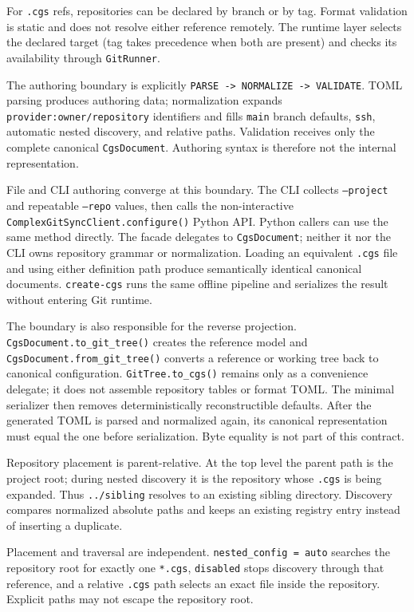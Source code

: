 For \texttt{.cgs} refs, repositories can be declared by branch or by tag.
Format validation is static and does not resolve either reference remotely.
The runtime layer selects the declared target (tag takes precedence when both
are present) and checks its availability through \texttt{GitRunner}.

The authoring boundary is explicitly
\texttt{PARSE -> NORMALIZE -> VALIDATE}.  TOML parsing produces authoring data;
normalization expands \texttt{provider:owner/repository} identifiers and fills
\texttt{main} branch defaults, \texttt{ssh}, automatic nested discovery, and
relative paths.  Validation receives only the complete canonical
\texttt{CgsDocument}.  Authoring syntax is therefore not the internal
representation.

File and CLI authoring converge at this boundary. The CLI collects
\texttt{--project} and repeatable \texttt{--repo} values, then calls the
non-interactive \texttt{ComplexGitSyncClient.configure()} Python API. Python
callers can use the same method directly. The facade delegates to
\texttt{CgsDocument}; neither it nor the CLI owns repository grammar or
normalization. Loading an equivalent \texttt{.cgs} file and using either
definition path produce semantically identical canonical documents.
\texttt{create-cgs} runs the same offline pipeline and serializes the result
without entering Git runtime.

The boundary is also responsible for the reverse projection.
\texttt{CgsDocument.to\_git\_tree()} creates the reference model and
\texttt{CgsDocument.from\_git\_tree()} converts a reference or working tree
back to canonical configuration. \texttt{GitTree.to\_cgs()} remains only as a
convenience delegate; it does not assemble repository tables or format TOML.
The minimal serializer then removes deterministically reconstructible defaults.
After the generated TOML is parsed and normalized again, its canonical
representation must equal the one before serialization. Byte equality is not
part of this contract.

Repository placement is parent-relative. At the top level the parent path is
the project root; during nested discovery it is the repository whose
\texttt{.cgs} is being expanded. Thus \texttt{../sibling} resolves to an
existing sibling directory. Discovery compares normalized absolute paths and
keeps an existing registry entry instead of inserting a duplicate.

Placement and traversal are independent. \texttt{nested\_config = auto}
searches the repository root for exactly one \texttt{*.cgs},
\texttt{disabled} stops discovery through that reference, and a relative
\texttt{.cgs} path selects an exact file inside the repository. Explicit paths
may not escape the repository root.

